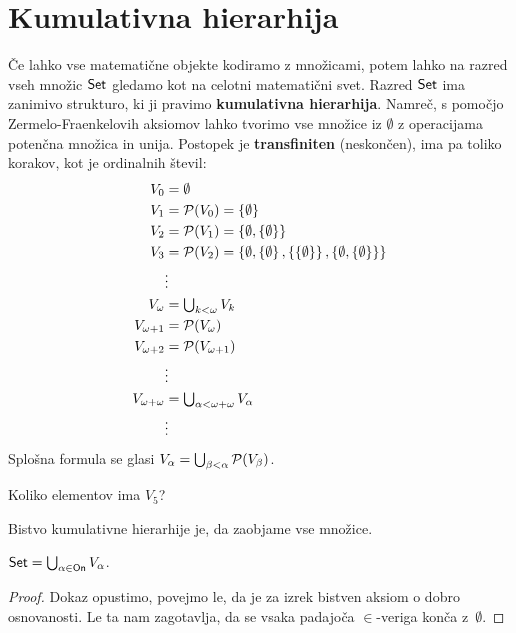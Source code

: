 \section{Kumulativna hierarhija}

Če lahko vse matematične objekte kodiramo z množicami, potem lahko na razred
vseh množic $\mathsf{Set}$ gledamo kot na celotni matematični svet. Razred $\mathsf{Set}$ ima
zanimivo strukturo, ki ji pravimo \textbf{kumulativna hierarhija}. Namreč, s pomočjo
Zermelo-Fraenkelovih aksiomov lahko tvorimo vse množice iz $\emptyset$ z
operacijama potenčna množica in unija. Postopek je \textbf{transfiniten} (neskončen), ima pa toliko korakov, kot je ordinalnih števil:
%
\begin{align*}
  V_0 &= \emptyset \\
  V_1 &= \mathcal{P}(V_0) = \left\{\emptyset\right\} \\
  V_2 &= \mathcal{P}(V_1) = \left\{\emptyset, \left\{\emptyset\right\}\right\} \\
  V_3 &= \mathcal{P}(V_2) = \left\{\emptyset, \left\{\emptyset\right\}, \left\{\left\{\emptyset\right\}\right\}, \left\{\emptyset, \left\{\emptyset\right\}\right\}\right\} \\
      &\vdots \\
  V_\omega &= \textstyle\bigcup_{k < \omega} V_k \\
  V_{\omega+1} &= \mathcal{P}(V_\omega) \\
  V_{\omega+2} &= \mathcal{P}(V_{\omega+1}) \\
  &\vdots \\
  V_{\omega + \omega} &= \textstyle\bigcup_{\alpha < \omega + \omega} V_\alpha \\
  &\vdots
\end{align*}
%
Splošna formula se glasi $V_\alpha = \textstyle\bigcup_{\beta < \alpha} \mathcal{P}(V_\beta)$.


\begin{vaja}
  Koliko elementov ima $V_5$?
\end{vaja}

Bistvo kumulativne hierarhije je, da zaobjame vse množice.

\begin{izrek}
  $\mathsf{Set} = \bigcup_{\alpha \in \mathsf{On}} V_\alpha$.
\end{izrek}

\begin{proof}
  Dokaz opustimo, povejmo le, da je za izrek bistven aksiom o dobro osnovanosti. Le ta nam zagotavlja, da se vsaka padajoča $\in$-veriga konča z~$\emptyset$.
\end{proof}


